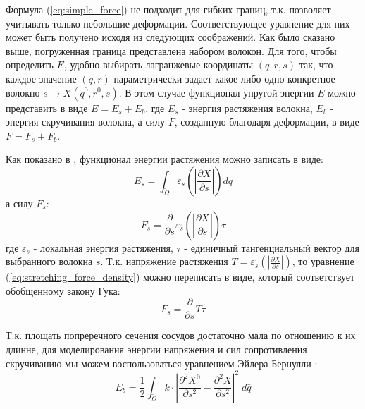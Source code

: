 Формула (\ref{eq:simple_force}) не подходит для гибких границ, т.к. позволяет
учитывать только небольшие деформации.  Соответствующее уравнение для них может
быть получено исходя из следующих соображений.  Как было сказано выше,
погруженная граница представлена набором волокон.  Для того, чтобы определить
$E$, удобно выбирать лагранжевые координаты $(q, r, s)$ так, что каждое
значение $(q, r)$ параметрически задает какое-либо одно конкретное волокно $s
\to X(q^0, r^0, s)$.  В этом случае функционал упругой энергии $E$ можно
представить в виде $E = E_s + E_b$, где $E_s$ - энергия растяжения волокна,
$E_b$ - энергия скручивания волокна, а силу $F$, созданную благодаря
деформации, в виде $F = F_s + F_b$.

Как показано в \cite{peskin2002immersed}, \cite{griffith2009simulating}
функционал энергии растяжения можно записать в виде:
\begin{equation}
    \label{eq:stretching_energy_functional}
    E_s = \int_{\tilde{\Omega}} \varepsilon_s \left(\left| \frac{\partial X}{\partial s} \right| \right) d\bar{q}
\end{equation}
а силу $F_s$:
\begin{equation}
    \label{eq:stretching_force_density}
    F_s = \frac{\partial}{\partial s} \varepsilon_s^{,} \left( \left| \frac{\partial X}{\partial s} \right| \right) \tau
\end{equation}
где $\varepsilon_s$ - локальная энергия растяжения, $\tau$ - единичный
тангенциальный вектор для выбранного волокна $s$.  Т.к. напряжение растяжения
$T = \varepsilon_s^{,} \left( \left| \frac{\partial X}{\partial s} \right|
\right)$, то уравнение (\ref{eq:stretching_force_density}) можно переписать в
виде, который соответствует обобщенному закону Гука:
\begin{equation}
    \label{eq:stretching_force_density_simplified}
    F_s = \frac{\partial}{\partial s} T \tau
\end{equation}

Т.к. площать попреречного сечения сосудов достаточно мала по отношению к их
длинне, для моделирования энергии напряжения и сил сопротивления скручиванию мы
можем воспользоваться уравнением Эйлера-Бернулли \cite{gere1997mechanics}:
\begin{equation}
    E_b = \frac{1}{2} \int_{\tilde{\Omega}} k \cdot \left| \frac{\partial^2 X^0}{\partial s^2} - \frac{\partial^2 X}{\partial s^2} \right|^2 \; d\bar{q}
\end{equation}

